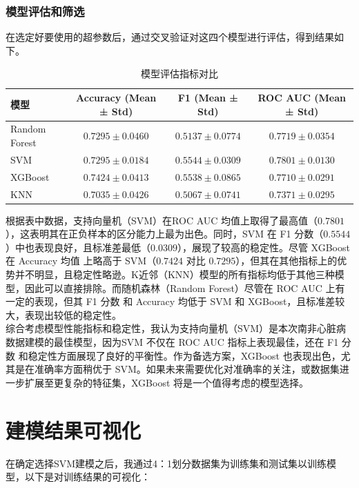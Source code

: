 \documentclass[UTF8]{article}
\begin{document}
	\subsubsection{模型评估和筛选}
	在选定好要使用的超参数后，通过交叉验证对这四个模型进行评估，得到结果如下。
	\begin{table}[ht]
		\centering
		\caption{模型评估指标对比}
		\begin{tabular}{|l|c|c|c|}
			\hline
			\textbf{模型}        & \textbf{Accuracy (Mean ± Std)} & \textbf{F1 (Mean ± Std)} & \textbf{ROC AUC (Mean ± Std)} \\ \hline
			Random Forest & $0.7295 \pm 0.0460$          & $0.5137 \pm 0.0774$      & $0.7719 \pm 0.0354$           \\ \hline
			SVM           & $0.7295 \pm 0.0184$          & $0.5544 \pm 0.0309$      & $0.7801 \pm 0.0130$           \\ \hline
			XGBoost       & $0.7424 \pm 0.0413$          & $0.5538 \pm 0.0865$      & $0.7710 \pm 0.0291$           \\ \hline
			KNN           & $0.7035 \pm 0.0426$          & $0.5067 \pm 0.0741$      & $0.7371 \pm 0.0295$           \\ \hline
		\end{tabular}
		\label{tab:model_comparison}
	\end{table}

	根据表中数据，支持向量机（SVM）在ROC AUC 均值上取得了最高值（$0.7801$），这表明其在正负样本的区分能力上最为出色。同时，SVM 在 F1 分数（$0.5544$）中也表现良好，且标准差最低（$0.0309$），展现了较高的稳定性。尽管 XGBoost 在 Accuracy 均值 上略高于 SVM（$0.7424$ 对比 $0.7295$），但其在其他指标上的优势并不明显，且稳定性略逊。K近邻（KNN）模型的所有指标均低于其他三种模型，因此可以直接排除。而随机森林（Random Forest）尽管在 ROC AUC 上有一定的表现，但其 F1 分数 和 Accuracy 均低于 SVM 和 XGBoost，且标准差较大，表现出较低的稳定性。\\
	\indent 综合考虑模型性能指标和稳定性，我认为支持向量机（SVM）是本次南非心脏病数据建模的最佳模型，因为SVM 不仅在 ROC AUC 指标上表现最佳，还在 F1 分数 和稳定性方面展现了良好的平衡性。作为备选方案，XGBoost 也表现出色，尤其是在准确率方面稍优于 SVM。如果未来需要优化对准确率的关注，或数据集进一步扩展至更复杂的特征集，XGBoost 将是一个值得考虑的模型选择。
	\newpage
	\section{建模结果可视化}
	在确定选择SVM建模之后，我通过4：1划分数据集为训练集和测试集以训练模型，以下是对训练结果的可视化：
\end{document}
